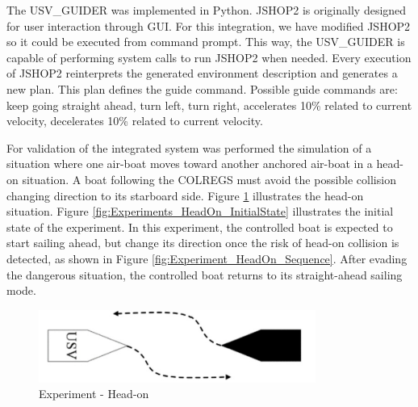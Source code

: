     The USV\_GUIDER was implemented in Python. \ac{JSHOP}2 is originally designed for user interaction through \ac{GUI}. For this integration, we have modified  \ac{JSHOP}2 so it could be executed from command prompt. This way, %
    the USV\_GUIDER is capable of performing system calls to run \ac{JSHOP}2 when needed. Every execution of \ac{JSHOP}2 reinterprets the generated environment description and generates a new plan. This plan defines the guide command. Possible guide commands are: keep going straight ahead, turn left, turn right, accelerates 10\% related to current velocity, decelerates 10\% related to current velocity.  
    
    For validation of the integrated system was performed the simulation of a situation where one air-boat moves toward another anchored air-boat in a head-on situation. A boat following the \ac{COLREGS} must avoid the possible collision changing direction to its starboard side. Figure \ref{fig:COLREGs_HeadOn} illustrates the head-on situation. Figure \ref{fig:Experiments_HeadOn_InitialState} illustrates the initial state of the experiment. In this experiment, the controlled boat is expected to start sailing ahead, but change its direction once the risk of head-on collision is detected, as shown in Figure \ref{fig:Experiment_HeadOn_Sequence}. After evading the dangerous situation, the controlled boat returns to its straight-ahead sailing mode.
    
    \begin{figure}[H] 
        \centering
        \includegraphics[scale=0.6]{figs/COLREGS_HeadOn.png}
        \caption{Experiment - Head-on}
        \label{fig:COLREGs_HeadOn}
    \end{figure}
    
